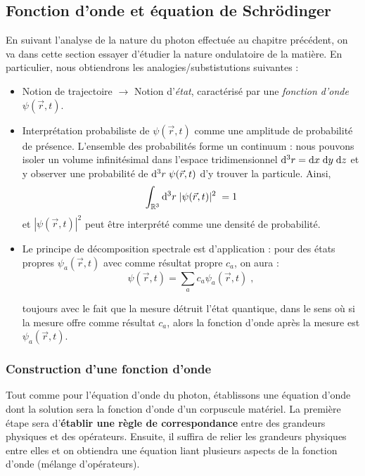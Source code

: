 \documentclass[12pt, a4paper]{book}
\begin{document}
\subsection{Fonction d'onde et équation de Schrödinger}
En suivant l'analyse de la nature du photon effectuée au chapitre précédent, on va dans cette section essayer d'étudier la nature ondulatoire de la matière. En particulier, nous obtiendrons les analogies/substistutions suivantes :
\begin{itemize}
\item Notion de trajectoire $\longrightarrow$ Notion d'\textit{état}, caractérisé par une \textit{fonction d'onde} $\psi(\vec r,t)$.
\item Interprétation probabiliste de $\psi(\vec r, t)$ comme une amplitude de probabilité de présence. L'ensemble des probabilités forme un continuum : nous pouvons isoler un volume infinitésimal dans l'espace tridimensionnel $\mathrm{d}^3 r = \mathrm{d}x \; \mathrm{d}y\; \mathrm{d}z$ et y observer une probabilité de $ \mathrm{d} ^3 r \; \psi(\vec r, t)$ d'y trouver la particule. Ainsi, 
\begin{equation}
\int_{\mathbb{R}^3} \mathrm{d} ^3 r \; |\psi(\vec r, t)|^2 \; = 1
\end{equation}
et $|\psi(\vec r, t)|^2$ peut être interprété comme une densité de probabilité.

\item Le principe de décomposition spectrale est d'application : pour des états propres $\psi_a(\vec r, t)$ avec comme résultat propre $c_a$, on aura :
$$\psi(\vec r, t) = \sum_a c_a \psi_a(\vec r, t) \; ,$$

toujours avec le fait que la mesure détruit l'état quantique, dans le sens où si la mesure offre comme résultat $c_a$, alors la fonction d'onde après la mesure est $\psi_a(\vec r, t)$.
\end{itemize}

\subsubsection{Construction d'une fonction d'onde}
Tout comme pour l'équation d'onde du photon, établissons une équation d'onde dont la solution sera la fonction d'onde d'un corpuscule matériel. La première étape sera d'\textbf{établir une règle de correspondance} entre des grandeurs physiques et des opérateurs. Ensuite, il suffira de relier les grandeurs physiques entre elles et on obtiendra une équation liant plusieurs aspects de la fonction d'onde (mélange d'opérateurs). \\
\end{document}
